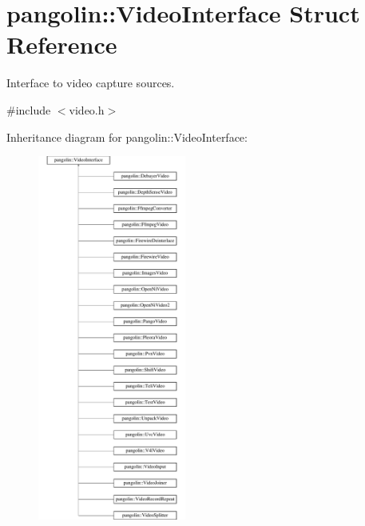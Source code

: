\hypertarget{structpangolin_1_1_video_interface}{}\section{pangolin\+:\+:Video\+Interface Struct Reference}
\label{structpangolin_1_1_video_interface}


Interface to video capture sources.  




{\ttfamily \#include $<$video.\+h$>$}

Inheritance diagram for pangolin\+:\+:Video\+Interface\+:\begin{figure}[H]
\begin{center}
\leavevmode
\includegraphics[height=12.000000cm]{structpangolin_1_1_video_interface}
\end{center}
\end{figure}
